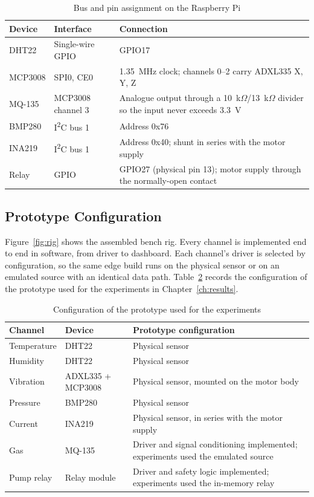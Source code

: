 \begin{table}[htbp]
\centering
\caption{Bus and pin assignment on the Raspberry Pi}
\label{tab:pinmap}
\small
\begin{tabularx}{\textwidth}{@{}l l X@{}}
\toprule
\textbf{Device} & \textbf{Interface} & \textbf{Connection} \\
\midrule
DHT22 & Single-wire GPIO & GPIO17 \\
MCP3008 & SPI0, CE0 & 1.35~MHz clock; channels 0--2 carry ADXL335 X, Y, Z \\
MQ-135 & MCP3008 channel 3 & Analogue output through a 10~k$\Omega$/13~k$\Omega$ divider so the input never exceeds 3.3~V \\
BMP280 & I\textsuperscript{2}C bus 1 & Address 0x76 \\
INA219 & I\textsuperscript{2}C bus 1 & Address 0x40; shunt in series with the motor supply \\
Relay & GPIO & GPIO27 (physical pin 13); motor supply through the normally-open contact \\
\bottomrule
\end{tabularx}
\end{table}

\subsection{Prototype Configuration}

Figure~\ref{fig:rig} shows the assembled bench rig. Every channel is implemented end to end in software, from driver to dashboard. Each channel's driver is selected by configuration, so the same edge build runs on the physical sensor or on an emulated source with an identical data path. Table~\ref{tab:protoconfig} records the configuration of the prototype used for the experiments in Chapter~\ref{ch:results}.

\begin{table}[htbp]
\centering
\caption{Configuration of the prototype used for the experiments}
\label{tab:protoconfig}
\small
\begin{tabularx}{\textwidth}{@{}l l X@{}}
\toprule
\textbf{Channel} & \textbf{Device} & \textbf{Prototype configuration} \\
\midrule
Temperature & DHT22 & Physical sensor \\
Humidity & DHT22 & Physical sensor \\
Vibration & ADXL335 + MCP3008 & Physical sensor, mounted on the motor body \\
Pressure & BMP280 & Physical sensor \\
Current & INA219 & Physical sensor, in series with the motor supply \\
Gas & MQ-135 & Driver and signal conditioning implemented; experiments used the emulated source \\
Pump relay & Relay module & Driver and safety logic implemented; experiments used the in-memory relay \\
\bottomrule
\end{tabularx}
\end{table}

